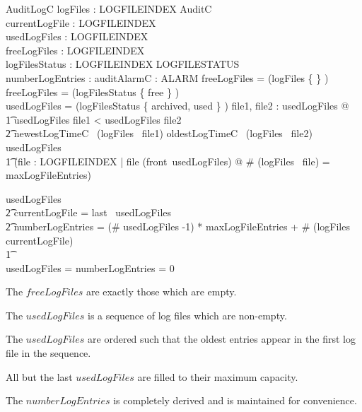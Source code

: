 \begin{schema}{AuditLogC}
        logFiles : LOGFILEINDEX \fun \finset AuditC
\\      currentLogFile : LOGFILEINDEX
\\      usedLogFiles : \iseq LOGFILEINDEX
\\      freeLogFiles : \power LOGFILEINDEX
\\      logFilesStatus : LOGFILEINDEX \fun LOGFILESTATUS
\\      numberLogEntries : \nat
\also 
        auditAlarmC : ALARM
\where
        freeLogFiles = \dom (logFiles \rres \{ \emptyset \} )
\\      freeLogFiles = \dom (logFilesStatus \rres \{ free \} )
\\      \ran usedLogFiles = \dom (logFilesStatus \rres \{ archived,
used \} )
\also
      \forall file1, file2 : \ran usedLogFiles @
\\ \t1  usedLogFiles \inv file1 < usedLogFiles \inv file2 \implies
\\ \t2   newestLogTimeC~ (logFiles~ file1) \leq oldestLogTimeC~
(logFiles~ file2) 
\also
      usedLogFiles \neq \langle \rangle 
\\ \t1 \implies (\forall file : LOGFILEINDEX | file \in \ran
      (front~usedLogFiles) @ \# (logFiles~ file) = maxLogFileEntries)
 
\also
        usedLogFiles \neq \langle \rangle 
\\ \t2  \land currentLogFile = last~ usedLogFiles
\\ \t2  \land numberLogEntries = (\# usedLogFiles -1) *
                maxLogFileEntries 
                + \# (logFiles~ currentLogFile)
\\ \t1 \lor
\\      usedLogFiles = \langle \rangle 
        \land numberLogEntries = 0
\end{schema}
\begin{Zcomment}
\item
The $freeLogFiles$ are exactly those which are empty.
\item
The $usedLogFiles$ is a sequence of log files which are non-empty.
\item
The $usedLogFiles$ are ordered such that the oldest entries appear in
the first log file in the sequence.
\item
All but the last $usedLogFiles$ are filled to their maximum capacity.
\item
The $numberLogEntries$ is completely derived and is maintained for
convenience. 
\end{Zcomment}

